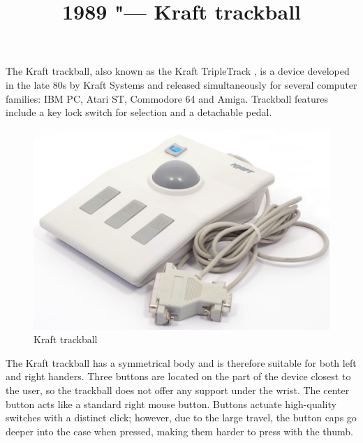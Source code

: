\documentclass[11pt, a4paper]{article}
\begin{document}
\title{1989 "--- Kraft trackball}
\date{}
\maketitle
{}
The Kraft trackball, also known as the Kraft TripleTrack \cite{triple}, is a device developed in the late 80s by Kraft Systems and released simultaneously for several computer families: IBM PC, Atari ST, Commodore 64 and Amiga. Trackball features include a key lock switch for selection and a detachable pedal.

\begin{figure}[h]
    \centering
    \includegraphics[scale=0.4]{1989_kraft_trackball/pic_30.jpg}
    \caption{Kraft trackball}
    \label{fig:KraftPhoto}
\end{figure}

The Kraft trackball has a symmetrical body and is therefore suitable for both left and right handers. Three buttons are located on the part of the device closest to the user, so the trackball does not offer any support under the wrist. The center button acts like a standard right mouse button. Buttons actuate high-quality switches with a distinct click; however, due to the large travel, the button caps go deeper into the case when pressed, making them harder to press with the thumb.
\end{document}
